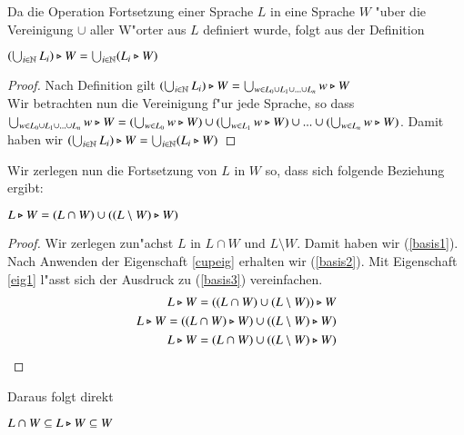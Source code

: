 Da die Operation Fortsetzung einer Sprache $L$ in eine Sprache $W$ "uber die Vereinigung $\cup$ aller W"orter aus $L$ definiert wurde, folgt aus der Definition

\vspace{2ex}

\begin{eigen}\label{cupeig}
$(\bigcup_{i\in\mathbb{N}} L_i) \triangleright W = \bigcup_{i\in\mathbb{N}} (L_i\triangleright W)$
\end{eigen}
\begin{proof} 
Nach Definition gilt $(\bigcup_{i\in\mathbb{N}} L_i) \triangleright W = \bigcup_{w\in L_0\cup L_1\cup ... \cup L_n} w\triangleright W$\\
Wir betrachten nun die Vereinigung f"ur jede Sprache, so dass $\bigcup_{w\in L_0\cup L_1\cup ... \cup L_n} w\triangleright W = (\bigcup_{w\in L_0} w\triangleright W) \cup (\bigcup_{w\in L_1} w\triangleright W) \cup ... \cup (\bigcup_{w\in L_n} w\triangleright W)$. Damit haben wir $ (\bigcup_{i\in\mathbb{N}} L_i) \triangleright W  = \bigcup_{i\in\mathbb{N}} (L_i\triangleright W)$
\end{proof}

Wir zerlegen nun die Fortsetzung von $L$ in $W$ so, dass sich folgende Beziehung ergibt:

\vspace{2ex}

\begin{eigen}\label{basiseigen}
$L\triangleright W = (L\cap W) \cup ((L\setminus W) \triangleright W)$
\end{eigen}
\begin{proof}
Wir zerlegen zun"achst $L$ in $L\cap W$ und $L\setminus W$. Damit haben wir (\ref{basis1}). 
Nach Anwenden der Eigenschaft \ref{cupeig} erhalten wir (\ref{basis2}). Mit Eigenschaft \ref{eig1} l"asst sich der Ausdruck zu (\ref{basis3}) vereinfachen.
\begin{eqnarray}
L\triangleright W = ((L\cap W) \cup (L\setminus W)) \triangleright W \label{basis1}\\
L\triangleright W = ((L\cap W) \triangleright W) \cup ((L\setminus W) \triangleright W) \label{basis2} \\
L\triangleright W = (L\cap W) \cup ((L\setminus W) \triangleright W) \label{basis3} 
\end{eqnarray}
\end{proof}

Daraus folgt direkt

\vspace{2ex}

\begin{folg}\label{klaro}
$L\cap W \subseteq L\triangleright W \subseteq W$
\end{folg}


